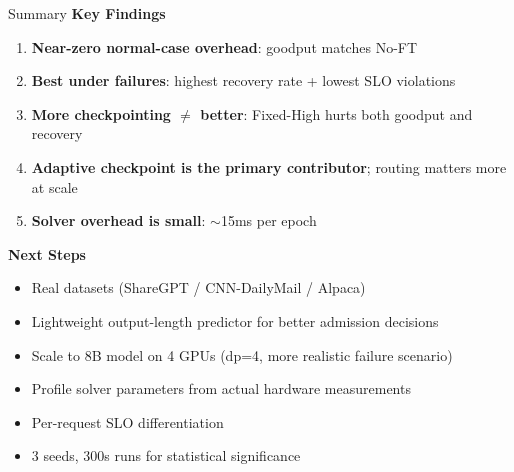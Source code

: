 \documentclass[aspectratio=169,12pt]{beamer}
\begin{document}
\begin{frame}{Summary}
\textbf{Key Findings}
\begin{enumerate}
    \item \textbf{Near-zero normal-case overhead}: goodput matches No-FT
    \item \textbf{Best under failures}: highest recovery rate + lowest SLO violations
    \item \textbf{More checkpointing $\neq$ better}: Fixed-High hurts both goodput and recovery
    \item \textbf{Adaptive checkpoint is the primary contributor}; routing matters more at scale
    \item \textbf{Solver overhead is small}: $\sim$15ms per epoch
\end{enumerate}

\vspace{0.5em}
\textbf{Next Steps}
\begin{itemize}
    \item Real datasets (ShareGPT / CNN-DailyMail / Alpaca)
    \item Lightweight output-length predictor for better admission decisions
    \item Scale to 8B model on 4 GPUs (dp=4, more realistic failure scenario)
    \item Profile solver parameters from actual hardware measurements
    \item Per-request SLO differentiation
    \item 3 seeds, 300s runs for statistical significance
\end{itemize}
\end{frame}
\end{document}
